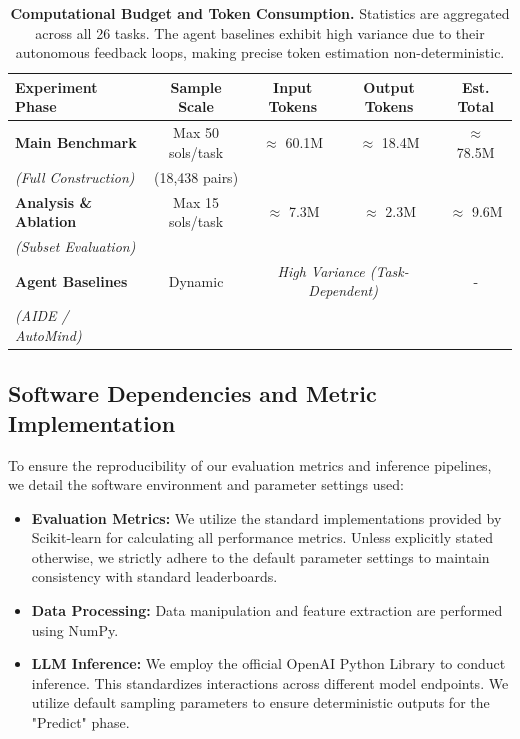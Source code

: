 \begin{table}
    \centering
    \small
    \begin{tabular}{lcccc}
        \toprule
        \textbf{Experiment Phase} & \textbf{Sample Scale} & \textbf{Input Tokens} & \textbf{Output Tokens} & \textbf{Est. Total} \\
        \midrule
        \textbf{Main Benchmark} & Max 50 sols/task & $\approx$ 60.1M & $\approx$ 18.4M & $\approx$ 78.5M \\
        \textit{(Full Construction)} & (18,438 pairs) & & & \\
        \midrule
        \textbf{Analysis \& Ablation} & Max 15 sols/task & $\approx$ 7.3M & $\approx$ 2.3M & $\approx$ 9.6M \\
        \textit{(Subset Evaluation)} & & & & \\
        \midrule
        \textbf{Agent Baselines} & Dynamic & \multicolumn{2}{c}{\textit{High Variance (Task-Dependent)}} & - \\
        \textit{(AIDE / AutoMind)} & & & & \\
        \bottomrule
    \end{tabular}
    \caption{\textbf{Computational Budget and Token Consumption.} Statistics are aggregated across all 26 tasks. The agent baselines exhibit high variance due to their autonomous feedback loops, making precise token estimation non-deterministic.}
    \label{tab:compute_budget}
\end{table}


\subsection{Software Dependencies and Metric Implementation}
\label{app:packages}

To ensure the reproducibility of our evaluation metrics and inference pipelines, we detail the software environment and parameter settings used:

\begin{itemize}
    \item \textbf{Evaluation Metrics:} We utilize the standard implementations provided by Scikit-learn for calculating all performance metrics. Unless explicitly stated otherwise, we strictly adhere to the default parameter settings to maintain consistency with standard leaderboards.
    \item \textbf{Data Processing:} Data manipulation and feature extraction are performed using NumPy.
    \item \textbf{LLM Inference:} We employ the official OpenAI Python Library to conduct inference. This standardizes interactions across different model endpoints. We utilize default sampling parameters to ensure deterministic outputs for the "Predict" phase.
\end{itemize}



